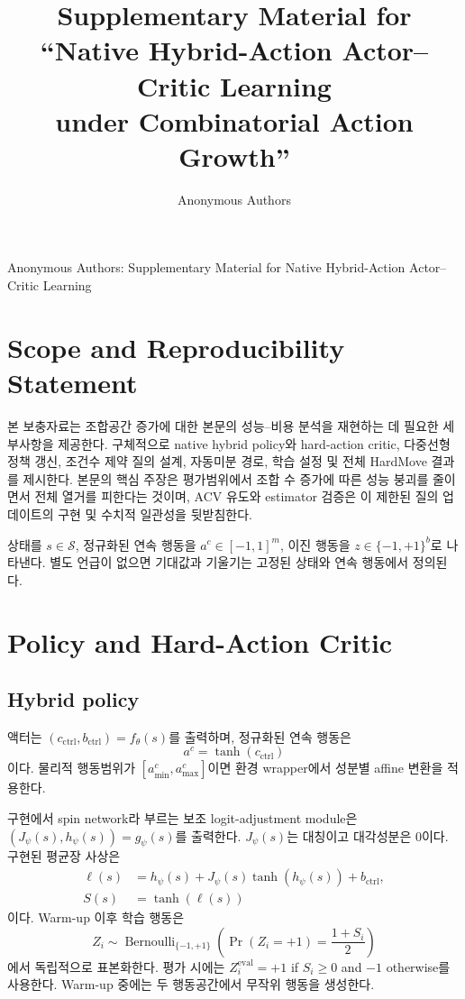 \documentclass[10pt,journal]{IEEEtran}
\begin{document}
\title{Supplementary Material for\\
``Native Hybrid-Action Actor--Critic Learning\\
under Combinatorial Action Growth''}
\author{Anonymous Authors}
%
{Anonymous Authors: Supplementary Material for Native Hybrid-Action Actor--Critic Learning}
\maketitle

\section{Scope and Reproducibility Statement}
\label{sec:scope}

본 보충자료는 조합공간 증가에 대한 본문의 성능--비용 분석을 재현하는 데 필요한 세부사항을 제공한다. 구체적으로 native hybrid policy와 hard-action critic, 다중선형 정책 갱신, 조건수 제약 질의 설계, 자동미분 경로, 학습 설정 및 전체 HardMove 결과를 제시한다. 본문의 핵심 주장은 평가범위에서 조합 수 증가에 따른 성능 붕괴를 줄이면서 전체 열거를 피한다는 것이며, ACV 유도와 estimator 검증은 이 제한된 질의 업데이트의 구현 및 수치적 일관성을 뒷받침한다.

상태를 $s\in\mathcal S$, 정규화된 연속 행동을 $a^c\in[-1,1]^m$, 이진 행동을 $z\in\{-1,+1\}^b$로 나타낸다. 별도 언급이 없으면 기대값과 기울기는 고정된 상태와 연속 행동에서 정의된다.

\section{Policy and Hard-Action Critic}
\label{sec:policy-critic}

\subsection{Hybrid policy}

액터는 $(c_{\mathrm{ctrl}},b_{\mathrm{ctrl}})=f_\theta(s)$를 출력하며, 정규화된 연속 행동은
\begin{equation}
a^c=\tanh(c_{\mathrm{ctrl}})
\end{equation}
이다. 물리적 행동범위가 $[a^c_{\min},a^c_{\max}]$이면 환경 wrapper에서 성분별 affine 변환을 적용한다.

구현에서 spin network라 부르는 보조 logit-adjustment module은 $(J_\psi(s),h_\psi(s))=g_\psi(s)$를 출력한다. $J_\psi(s)$는 대칭이고 대각성분은 0이다. 구현된 평균장 사상은
\begin{align}
\ell(s)&=h_\psi(s)+J_\psi(s)\tanh(h_\psi(s))+b_{\mathrm{ctrl}},\\
S(s)&=\tanh(\ell(s))
\end{align}
이다. Warm-up 이후 학습 행동은
\begin{equation}
Z_i\sim\operatorname{Bernoulli}_{\{-1,+1\}}
\left(\Pr(Z_i=+1)=\frac{1+S_i}{2}\right)
\end{equation}
에서 독립적으로 표본화한다. 평가 시에는
$Z_i^{\mathrm{eval}}=+1$ if $S_i\geq0$ and $-1$ otherwise를 사용한다. Warm-up 중에는 두 행동공간에서 무작위 행동을 생성한다.
\end{document}
